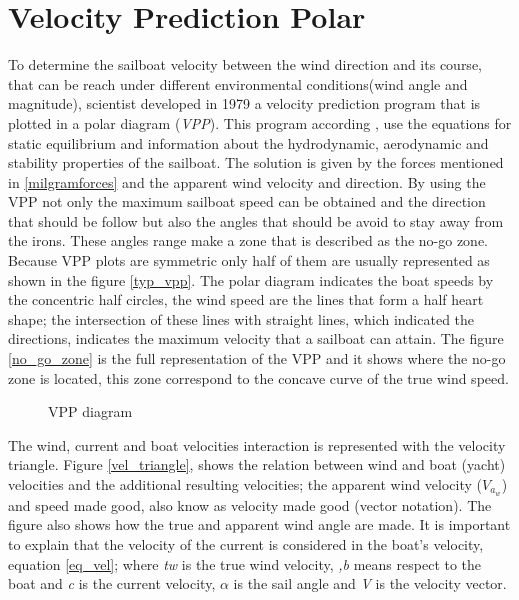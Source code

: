 \section{Velocity Prediction Polar}
To determine the sailboat velocity between the wind direction and its course, that can be reach under different environmental conditions(wind angle and magnitude), scientist developed in 1979 a velocity prediction program that is plotted in a polar diagram (\textit{VPP}). This program according  \cite{larsonprinciples}, use the equations for static equilibrium and information about the hydrodynamic, aerodynamic and stability properties of the sailboat.  The solution is given by  the forces mentioned in \ref{milgramforces} and the apparent wind velocity and direction. By using the VPP not only the maximum sailboat speed can be obtained and the direction that should be follow but also the angles that should be avoid to stay away from the irons\cite{yang2011control}. These angles range make a zone that is described as the no-go zone.\\

Because VPP plots are symmetric only half of them are usually represented as shown in the figure \ref {typ_vpp}. The polar diagram indicates the boat speeds by the concentric half circles, the wind speed are the lines that form a half heart shape; the intersection of these lines with straight lines, which indicated the directions, indicates the maximum velocity that a sailboat can attain. The figure \ref{no_go_zone} is the full representation of the VPP and it shows where the no-go zone is located, this zone correspond to the concave curve of the true wind speed.\\

\begin{figure}[h]
  \centering
  \hfill
  \caption{VPP diagram}
\label{vpp_diag} 
\end{figure}

The wind, current and boat velocities interaction is represented with the velocity triangle.  Figure \ref{vel_triangle}, shows the relation between wind and boat (yacht) velocities and the additional resulting velocities; the apparent wind velocity ($V_a_w$) and speed made good,  also know as velocity made good (vector notation). The figure also shows how the true and apparent wind angle are made. It is important to explain that the velocity of the current is considered in the boat's velocity, equation \ref{eq_vel}; where \textit{tw} is the true wind velocity, \textit{,b} means respect to the boat and \textit{c} is the current velocity, $\alpha$ is the sail angle and \textit{V} is the velocity vector. \\

